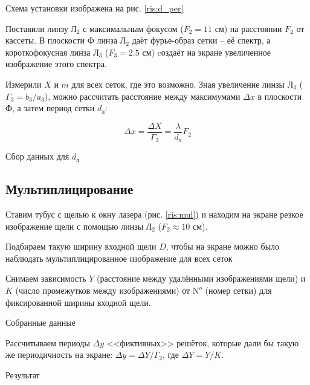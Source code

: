 \documentclass[a5paper,10pt, twoside]{article} %
\begin{document}
	Схема установки изображена на рис. \ref{ris:d_per}

	Поставили линзу $\text{Л}_2$ с максимальным фокусом ($F_2 = 11$ см) на расстоянии $F_2$ от 
	кассеты. В плоскости $\text{Ф}$ линза $\text{Л}_2$ даёт фурье-образ сетки -- её спектр, а 
	короткофокусная линза $\text{Л}_3$ ($F_3 = 2.5$ см) cоздаёт на экране увеличенное изображение 
	этого спектра.

	Измерили $X$ и $m$ для всех сеток, где это возможно. Зная увеличение линзы $\text{Л}_3$ 
	($\Gamma_3 = b_3 / a_3$), можно рассчитать расстояние между максимумами $\Delta x$ в плоскости 
	$\text{Ф}$, а затем период сетки $d_{\text{л}}$:

	\begin{equation}
		\Delta x = \frac{\Delta X}{\Gamma_3} = \frac{\lambda}{d_{\text{л}}} F_2	
	\end{equation}

	\begin{table}[h]
		\caption{Сбор данных для $d_{\text{л}}$}
	\end{table}

\subsection{Мультиплицирование}

	Ставим тубус с щелью к окну лазера (рис. \ref{ris:mul}) и находим на экране резкое изображение
	щели с помощью линзы $\text{Л}_2$ ($F_2 \approx 10$ см).

	Подбираем такую ширину входной щели $D$, чтобы на экране можно было	наблюдать мультиплицированное
	изображение для всех сеток

	Снимаем зависимость $Y$ (расстояние между удалёнными изображениями щели) и $K$ (число промежутков 
	между изображениями) от $\text{N}^o$ (номер сетки) для фиксированной ширины входной щели.

	\newpage

	\begin{table}
		\caption{Собранные данные}
	\end{table}

	Рассчитываем периоды $\Delta y$ <<фиктивных>> решёток, которые дали бы такую же периодичность на
	экране: $\Delta y = \Delta Y / \Gamma_2$, где $\Delta Y = Y / K$.

	\begin{table}
		\caption{Результат}
	\end{table}
\end{document}
